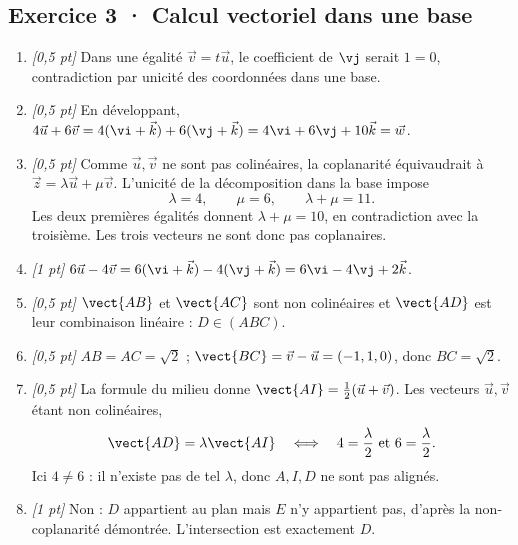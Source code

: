 \subsection*{Exercice 3 · Calcul vectoriel dans une base}\begin{enumerate}

\item \textit{[0,5 pt]} Dans une égalité $\vec v=t\vec u$, le coefficient de $\vj $ serait $1=0$, contradiction par unicité des coordonnées dans une base.

\item \textit{[0,5 pt]} En développant, $4\vec u+6\vec v=4(\vi +\vec k)+6(\vj +\vec k)=4\vi +6\vj +10\vec k=\vec w$.

\item \textit{[0,5 pt]} Comme $\vec u,\vec v$ ne sont pas colinéaires, la coplanarité équivaudrait à $\vec z=\lambda\vec u+\mu\vec v$. L'unicité de la décomposition dans la base impose
\[\lambda=4,\qquad\mu=6,\qquad\lambda+\mu=11.\]
Les deux premières égalités donnent $\lambda+\mu=10$, en contradiction avec la troisième. Les trois vecteurs ne sont donc pas coplanaires.

\item \textit{[1 pt]} $6\vec u-4\vec v=6(\vi +\vec k)-4(\vj +\vec k)=6\vi -4\vj +2\vec k$.

\item \textit{[0,5 pt]} $\vect{AB}$ et $\vect{AC}$ sont non colinéaires et $\vect{AD}$ est leur combinaison linéaire : $D\in(ABC)$.

\item \textit{[0,5 pt]} $AB=AC=\sqrt2$ ; $\vect{BC}=\vec v-\vec u=(-1,1,0)$, donc $BC=\sqrt2$.

\item \textit{[0,5 pt]} La formule du milieu donne $\vect{AI}=\frac12(\vec u+\vec v)$. Les vecteurs $\vec u,\vec v$ étant non colinéaires,
\[\vect{AD}=\lambda\vect{AI}\quad\Longleftrightarrow\quad 4=\frac{\lambda}{2}\ \text{et}\ 6=\frac{\lambda}{2}.\]
Ici $4\ne 6$ : il n'existe pas de tel $\lambda$, donc $A,I,D$ ne sont pas alignés.

\item \textit{[1 pt]} Non : $D$ appartient au plan mais $E$ n'y appartient pas, d'après la non-coplanarité démontrée. L'intersection est exactement $D$.

\end{enumerate}

